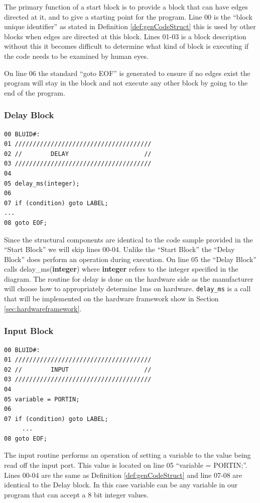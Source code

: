 The primary function of a start block is to provide a block that 
can have edges directed at it, and to give a starting point for 
the program. Line 00 is the ``block unique identifier'' as stated 
in Definition \ref{def:genCodeStruct} this is used by other blocks 
when edges are directed at this block. Lines 01-03 is a block 
description without this it becomes difficult to 
determine what kind of block is executing if the code needs to 
be examined by human eyes. 

On line 06 the standard ``goto EOF'' is generated to ensure if no 
edges exist the program will stay in the block and not execute any 
other block by going to the end of the program.

\subsubsection{Delay Block}
\label{def:cmpdelayblock}
\begin{lstlisting}[frame=single]
00 BLUID#:
01 //////////////////////////////////////
02 //        DELAY                     //
03 //////////////////////////////////////
04
05 delay_ms(integer);
06 
07 if (condition) goto LABEL;
...
08 goto EOF;
\end{lstlisting}

Since the structural components are identical to the code sample 
provided in the ``Start Block'' we will skip lines 00-04. Unlike 
the ``Start Block'' the ``Delay Block'' does perform an operation 
during execution. On line 05 the ``Delay Block'' calls 
delay\_ms(\textbf{integer}) where \textbf{integer} refers to the 
integer specified in the diagram. The routine for delay is done 
on the hardware side as the manufacturer will choose how to appropriately
determine 1ms on hardware. \texttt{delay\_ms} is a call that will
be implemented on the hardware framework show in Section \ref{sec:hardwareframework}.

\subsubsection{Input Block}
\label{def:cmpinputblock}
\begin{lstlisting}[frame=single]
00 BLUID#:
01 //////////////////////////////////////
02 //        INPUT                     //
03 //////////////////////////////////////
04
05 variable = PORTIN;
06 
07 if (condition) goto LABEL;
     ...
08 goto EOF;
\end{lstlisting}

The input routine performs an operation of setting a variable 
to the value being read off the input port. This value is located 
on line 05 ``variable = PORTIN;''. Lines 00-04 are the same as 
Definition \ref{def:genCodeStruct} and line 07-08 are identical 
to the Delay block. In this case variable can be any variable in
our program that can accept a 8 bit integer values.


